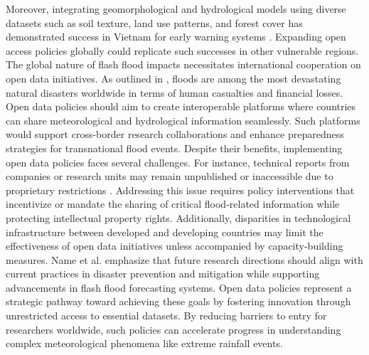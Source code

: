 Moreover, integrating geomorphological and hydrological models using diverse datasets such as soil texture, land use patterns, and forest cover has demonstrated success in Vietnam for early warning systems \citep{AlRawas2024}. Expanding open access policies globally could replicate such successes in other vulnerable regions. The global nature of flash flood impacts necessitates international cooperation on open data initiatives. As outlined in \citep{Ngo2018}, floods are among the most devastating natural disasters worldwide in terms of human casualties and financial losses. Open data policies should aim to create interoperable platforms where countries can share meteorological and hydrological information seamlessly. Such platforms would support cross-border research collaborations and enhance preparedness strategies for transnational flood events. Despite their benefits, implementing open data policies faces several challenges. For instance, technical reports from companies or research units may remain unpublished or inaccessible due to proprietary restrictions \citep{Maqtan2022a}\citep{Maqtan2022b}. Addressing this issue requires policy interventions that incentivize or mandate the sharing of critical flood-related information while protecting intellectual property rights. Additionally, disparities in technological infrastructure between developed and developing countries may limit the effectiveness of open data initiatives unless accompanied by capacity-building measures. Name et al. \citep{Wang2023} emphasize that future research directions should align with current practices in disaster prevention and mitigation while supporting advancements in flash flood forecasting systems. Open data policies represent a strategic pathway toward achieving these goals by fostering innovation through unrestricted access to essential datasets. By reducing barriers to entry for researchers worldwide, such policies can accelerate progress in understanding complex meteorological phenomena like extreme rainfall events.

